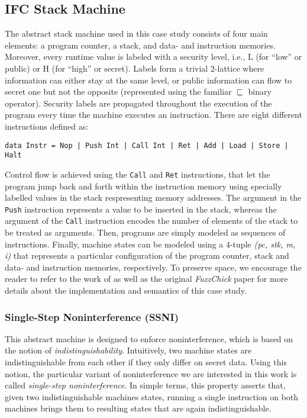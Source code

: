 \documentclass[acmsmall, anonymous]{acmart}
\newcommand{\fuzzchick}{\textit{FuzzChick}\xspace}
\begin{document}
\subsection{IFC Stack Machine}

The abstract stack machine used in this case study consists of four main
elements: a program counter, a stack, and data- and instruction memories.
%
Moreover, every runtime value is labeled with a security level, i.e., L (for
``low'' or public) or H (for ``high'' or secret).
%
Labels form a trivial 2-lattice where information can either stay at the same
level, or public information can flow to secret one but not the opposite
(represented using the familiar $\sqsubseteq$ binary operator).
%
Security labels are propagated throughout the execution of the program every
time the machine executes an instruction.
%
There are eight different instructions defined as:
%
\begin{verbatim}
data Instr = Nop | Push Int | Call Int | Ret | Add | Load | Store | Halt
\end{verbatim}

\noindent Control flow is achieved using the \texttt{Call} and \texttt{Ret}
instructions, that let the program jump back and forth within the instruction
memory using specially labelled values in the stack respresenting memory
addresses.
%
The argument in the \texttt{Push} instruction represents a value to be
inserted in the stack, whereas the argument of the \texttt{Call} instruction
encodes the number of elements of the stack to be treated as arguments.
%
Then, programs are simply modeled as sequences of instructions.
%
Finally, machine states can be modeled using a 4-tuple \textit{(pc, stk, m, i)}
that represents a particular configuration of the program counter, stack and
data- and instruction memories, respectively.
%
To preserve space, we encourage the reader to refer to the work of
\citeauthor{catalin} as well as the original \fuzzchick paper for more details
about the implementation and semantics of this case study.

\subsubsection{Single-Step Noninterference (SSNI)}

This abstract machine is designed to enforce noninterference, which is based on
the notion of \emph{indistinguishability}.
%
Intuitively, two machine states are indistinguishable from each other if they
only differ on secret data.
%
Using this notion, the particular variant of noninterference we are interested
in this work is called \emph{single-step noninterference}.
%
In simple terms, this property asserts that, given two indistinguishable
machines states, running a single instruction on both machines brings them to
resulting states that are again indistinguishable.
\end{document}
